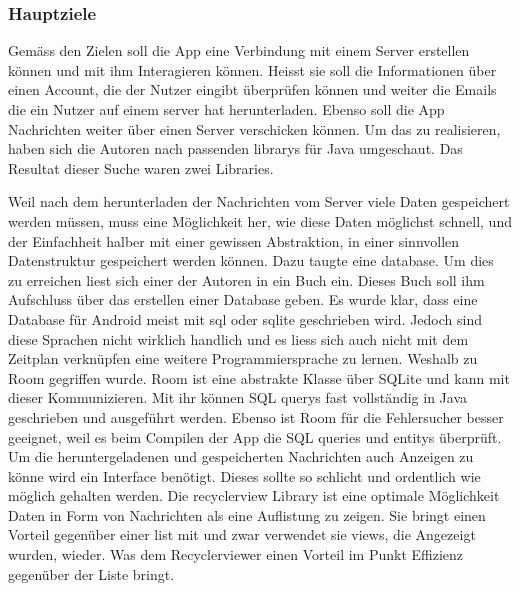 \documentclass[a4paper,11pt]{article}
\begin{document}

\subsubsection{Hauptziele}
Gemäss den Zielen soll die App eine Verbindung mit einem Server erstellen können und mit ihm Interagieren können. Heisst sie soll die Informationen über einen Account, die der 
Nutzer eingibt überprüfen können und weiter die Emails die ein Nutzer auf einem \gls{server} hat herunterladen. Ebenso soll die App Nachrichten weiter über einen Server verschicken können. 
Um das zu realisieren, haben sich die Autoren nach passenden \glspl{library} für Java umgeschaut. Das Resultat dieser Suche waren zwei Libraries. 

Weil nach dem herunterladen der Nachrichten vom Server viele Daten gespeichert werden müssen, muss eine Möglichkeit her, wie diese Daten möglichst schnell, 
und der Einfachheit halber mit einer gewissen Abstraktion, in einer sinnvollen Datenstruktur gespeichert werden können. Dazu taugte eine \gls{database}. Um dies zu erreichen 
liest sich einer der Autoren in ein Buch ein. Dieses Buch soll ihm Aufschluss über das erstellen einer Database geben. 
Es wurde klar, dass eine Database für Android meist mit \gls{sql} oder \gls{sqlite} geschrieben wird. Jedoch sind diese Sprachen nicht wirklich handlich und es
liess sich auch nicht mit dem Zeitplan verknüpfen eine weitere Programmiersprache zu lernen. Weshalb zu Room gegriffen wurde. Room ist eine abstrakte Klasse über SQLite 
und kann mit dieser Kommunizieren. Mit ihr können SQL \glspl{query} fast vollständig in Java geschrieben und ausgeführt werden. Ebenso ist Room für die Fehlersucher besser geeignet, 
weil es beim Compilen der App die SQL queries und \glspl{entity} überprüft. \cite{roomInfo} \\

Um die heruntergeladenen und gespeicherten Nachrichten auch Anzeigen zu könne wird ein Interface benötigt. Dieses sollte so schlicht und ordentlich wie möglich gehalten werden. 
Die \gls{recyclerview} Library ist eine optimale Möglichkeit Daten in Form von Nachrichten als eine Auflistung zu zeigen. Sie bringt einen Vorteil gegenüber einer \gls{list} mit und zwar
verwendet sie \glspl{view}, die Angezeigt wurden, wieder. Was dem Recyclerviewer einen Vorteil im Punkt Effizienz gegenüber der Liste bringt. \cite{recyclerViewRecycle}
\end{document}
